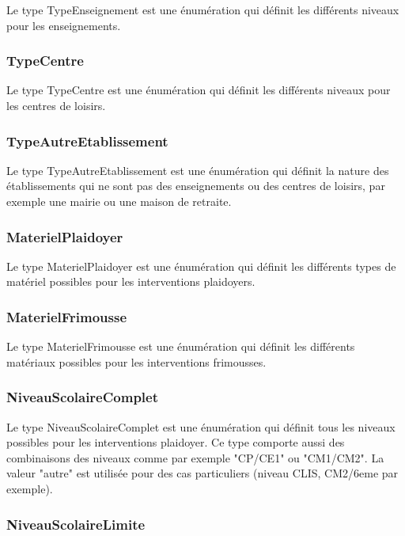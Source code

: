 Le type TypeEnseignement est une énumération qui définit les différents niveaux pour les enseignements.

\subsubsection*{TypeCentre}

Le type TypeCentre est une énumération qui définit les différents niveaux pour les centres de loisirs.

\subsubsection*{TypeAutreEtablissement}

Le type TypeAutreEtablissement est une énumération qui définit la nature des établissements qui ne sont pas des enseignements ou des centres de loisirs, par exemple une mairie ou une maison de retraite.

\subsubsection*{MaterielPlaidoyer}

Le type MaterielPlaidoyer est une énumération qui définit les différents types de matériel possibles pour les interventions plaidoyers.

\subsubsection*{MaterielFrimousse}

Le type MaterielFrimousse est une énumération qui définit les différents matériaux possibles pour les interventions frimousses.

\subsubsection*{NiveauScolaireComplet}

Le type NiveauScolaireComplet est une énumération qui définit tous les niveaux possibles pour les interventions plaidoyer. Ce type comporte aussi des combinaisons des niveaux comme par exemple "CP/CE1" ou "CM1/CM2". La valeur "autre" est utilisée pour des cas particuliers (niveau CLIS, CM2/6eme par exemple).

\subsubsection*{NiveauScolaireLimite}

